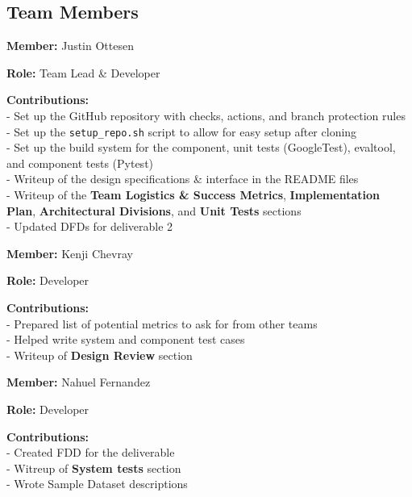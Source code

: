 \subsection*{Team Members}

\textbf{Member:} Justin Ottesen

\smallskip

\textbf{Role:} Team Lead \& Developer

\smallskip

\textbf{Contributions:} \\
- Set up the GitHub repository with checks, actions, and branch protection rules \\
- Set up the \verb|setup_repo.sh| script to allow for easy setup after cloning \\
- Set up the build system for the component, unit tests (GoogleTest), evaltool, and component tests (Pytest) \\
- Writeup of the design specifications \& interface in the README files \\
- Writeup of the \textbf{Team Logistics \& Success Metrics}, \textbf{Implementation Plan}, \textbf{Architectural Divisions}, and \textbf{Unit Tests} sections \\
- Updated DFDs for deliverable 2

\bigskip

\textbf{Member:} Kenji Chevray

\smallskip

\textbf{Role:} Developer

\smallskip

\textbf{Contributions:} \\
- Prepared list of potential metrics to ask for from other teams \\
- Helped write system and component test cases  \\
- Writeup of \textbf{Design Review} section

\bigskip

\textbf{Member:} Nahuel Fernandez

\smallskip

\textbf{Role:} Developer

\smallskip

\textbf{Contributions:} \\
- Created FDD for the deliverable \\
- Witreup of \textbf{System tests} section \\
- Wrote Sample Dataset descriptions


\bigskip

